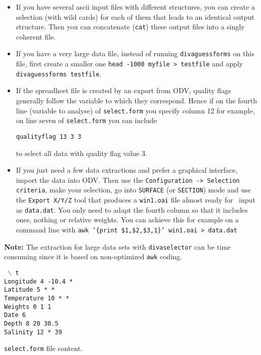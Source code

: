 \begin{itemize}
\item If you have several ascii input files with different structures, you can create a selection (with wild cards) for each of them that leads to an identical output structure. Then you can concatenate ({\tt cat}) these output files into a singly coherent
file.

\item If you have a very large data file, instead of running {\tt divaguessforms} on this file, first create a smaller one {\tt head -1000 myfile > testfile} and apply {\tt divaguessforms testfile}.

\item If the spreadheet file is created by an export from ODV, quality flags generally follow the variable to which they correspond. Hence if on the fourth line (variable to analyse) of {\tt select.form} you specify column 12 for example, on line seven of {\tt select.form} you can include 

{\tt qualityflag  13   3 3}

to select all data with quality flag value 3.

\item If you just need a few data extractions and prefer a graphical interface, import the data into ODV. Then use the
{\tt Configuration -> Selection criteria}, make your selection, go into {\tt SURFACE} (or {\tt SECTION}) mode and use the {\tt Export X/Y/Z} tool that produces a {\tt win1.oai} file almost ready for \diva\, input as {\tt data.dat}. You only need to adapt the fourth column so that it includes ones, nothing or relative weights. You can achieve this for example on a command line with {\tt awk '\{print \$1,\$2,\$3,1\}' win1.oai > data.dat}
\end{itemize}

{\bf Note:} The extraction for large data sets with {\tt divaselector} can be time consuming since it is based on non-optimized {\tt awk} coding.
 
\begin{exfile}[H]
\begin{footnotesize}
\texttt{
$\backslash$ t\\
Longitude  4  -10.4  *\\
Latitude  5  *  *\\
Temperature  10  *  *\\
Weights   0   1    1\\
Date  6  \\
Depth  8  20  30.5\\
Salinity  12  *  39\\
}
\end{footnotesize}
\caption{{\tt select.form} file content.} 
\end{exfile}


